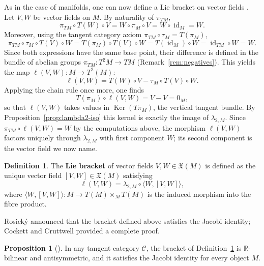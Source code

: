 \documentclass{amsart}
\newcommand{\R}{\mathbb{R}}
\DeclareMathOperator{\id}{id}
\DeclareMathOperator{\Ker}{Ker}
\theoremstyle{definition}
\newtheorem{defn}[thm]{Definition}
\newtheorem{prop}[thm]{Proposition}
\begin{document}
As in the case of manifolds, one can now define a Lie bracket on vector fields
\cite[Section~3.4]{CC14}.
Let $V, W$ be vector fields on $M$.
By naturality of $\pi_{TM}$,
\begin{equation*}
  \pi_{TM} \circ T(W) \circ V = W \circ \pi_M \circ V = W \circ \id_M = W.
\end{equation*}
Moreover, using the tangent category axiom $\pi_{TM} \circ \tau_M = T(\pi_M)$,
\begin{equation*}
  \pi_{TM} \circ \tau_M \circ T(V) \circ W
    = T(\pi_M) \circ T(V) \circ W
    = T(\id_M) \circ W
    = \id_{TM} \circ W
    = W.
\end{equation*}
Since both expressions have the same base point, their difference is defined in
the bundle of abelian groups $\pi_{TM}\colon T^2M \to TM$
(Remark~\ref{rem:negatives}). This yields the map
$\ell(V,W) \colon M \to T^2(M)$:
\begin{equation*}
  \ell(V,W) = T(W) \circ V - \tau_M \circ T(V) \circ W .
\end{equation*}
Applying the chain rule once more, one finds
\begin{equation*}
  T(\pi_M) \circ \ell(V,W) = V - V = 0_M,
\end{equation*}
so that $\ell(V,W)$ takes values in $\Ker(T\pi_M)$, the vertical tangent
bundle. By Proposition~\ref{prop:lambda2-iso} this kernel is exactly the image
of $\lambda_{2,M}$. Since $\pi_{TM} \circ \ell(V,W) = W$ by the computations
above, the morphism $\ell(V,W)$ factors uniquely through $\lambda_{2,M}$ with
first component $W$; its second component is the vector field we now name.

\begin{defn}\label{def:lie-bracket}
The \textbf{Lie bracket} of vector fields $V, W \in \mathfrak{X}(M)$
is defined as the unique vector field $[V,W] \in \mathfrak{X}(M)$ satisfying
\begin{equation*}
  \ell(V,W) = \lambda_{2,M} \circ \langle W, [V,W] \rangle,
\end{equation*}
where $\langle W, [V,W] \rangle \colon M \to T(M) \times_M T(M)$
is the induced morphism into the fibre product.
\end{defn}

Rosick\'{y} \cite{R} announced that the bracket defined above satisfies
the Jacobi identity; Cockett and Cruttwell \cite{CC15} provided a complete
proof.

\begin{prop}[{\cite[Theorem~4.2]{CC15}}]\label{thm:jacobi}
In any tangent category $\mathcal{C}$, the bracket of
Definition~\ref{def:lie-bracket} is $\R$-bilinear and antisymmetric, and it
satisfies the Jacobi identity for every object $M$.
\end{prop}
\end{document}
